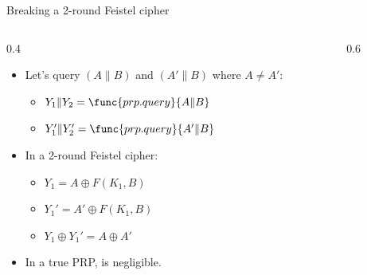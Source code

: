 \ifdefined\PRESENTATION\else\PassOptionsToClass{handout}{beamer}\fi\documentclass[aspectratio=169, lualatex]{beamer}
\begin{document}
\begin{frame}{Breaking a 2-round Feistel cipher}
	\begin{columns}[c]
		\begin{column}{0.4\textwidth}
			\begin{itemize}
				\item Let's query $(A \| B)$ and $(A' \| B)$ where $A \neq A'$:
				      \begin{itemize}
					      \item $Y_1 \| Y_2 = \func{prp.query}{A \| B}$
					      \item $Y_1' \| Y_2' = \func{prp.query}{A' \| B}$
				      \end{itemize}
				\item In a 2-round Feistel cipher:
				      \begin{itemize}
					      \item $Y_1 = A \oplus F(K_1, B)$
					      \item $Y_1' = A' \oplus F(K_1, B)$
					      \item $Y_1 \oplus Y_1' = A \oplus A'$
				      \end{itemize}
				\item In a true PRP,  is negligible.
			\end{itemize}
		\end{column}
		\begin{column}{0.6\textwidth}
			\begin{center}
			\end{center}
		\end{column}
	\end{columns}
\end{frame}
\end{document}
